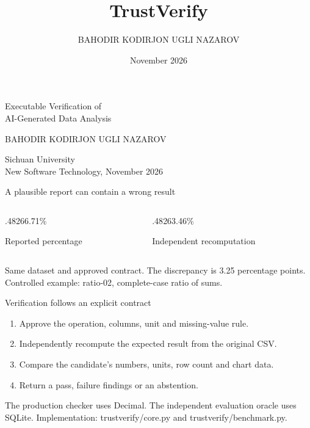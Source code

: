 \documentclass[aspectratio=169,11pt]{beamer}
\title{TrustVerify}
\author{BAHODIR KODIRJON UGLI NAZAROV}
\date{November 2026}
\newcommand{\source}[1]{\vfill{\tiny\color{Muted}#1}}
\begin{document}
{
\begin{frame}[plain]
\color{white}\vspace{6mm}{\Huge\bfseries TrustVerify}\par\vspace{8mm}
{\LARGE Executable Verification of\\AI-Generated Data Analysis}\par\vspace{14mm}
{\normalsize BAHODIR KODIRJON UGLI NAZAROV}\par\vspace{4mm}
{\small Sichuan University\\New Software Technology, November 2026}
\end{frame}}
\begin{frame}{A plausible report can contain a wrong result}
\begin{columns}[T]\begin{column}{.48\textwidth}{\Huge\color{Copper}266.71\%}\par\vspace{4mm}Reported percentage\end{column}
\begin{column}{.48\textwidth}{\Huge\color{Cobalt}263.46\%}\par\vspace{4mm}Independent recomputation\end{column}\end{columns}
\vspace{12mm}Same dataset and approved contract. The discrepancy is 3.25 percentage points.
\source{Controlled example: ratio-02, complete-case ratio of sums.}
\end{frame}
\begin{frame}{Verification follows an explicit contract}
\begin{enumerate}
\item Approve the operation, columns, unit and missing-value rule.
\item Independently recompute the expected result from the original CSV.
\item Compare the candidate's numbers, units, row count and chart data.
\item Return a pass, failure findings or an abstention.
\end{enumerate}
\vspace{5mm}The production checker uses Decimal. The independent evaluation oracle uses SQLite.
\source{Implementation: trustverify/core.py and trustverify/benchmark.py.}
\end{frame}
\end{document}
